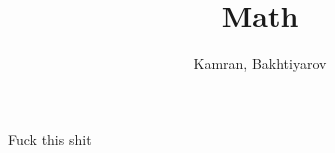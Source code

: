 \documentclass{report}
\title{\Huge{Math}}
\author{Kamran, Bakhtiyarov}
\date{}
\begin{document}
Fuck this shit
\end{document}
